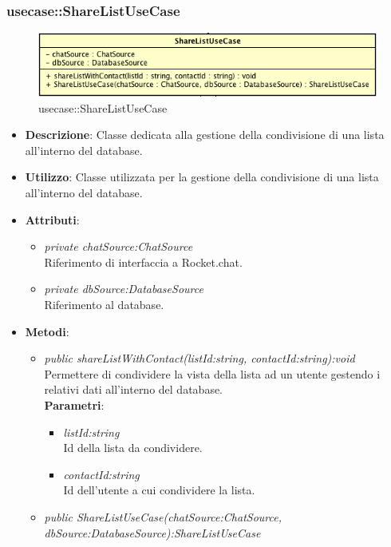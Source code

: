 \subsubsection{usecase::ShareListUseCase}

\label{usecase::ShareListUseCase}
\begin{figure}[H]
	\centering
	\includegraphics[scale=0.5]{Sezioni/SottosezioniST/img/app/ShareListUseCase.png}
	\caption{usecase::ShareListUseCase}
\end{figure}

\begin{itemize}
\item \textbf{Descrizione}: Classe dedicata alla gestione della condivisione di una lista all'interno del database.
\item \textbf{Utilizzo}: Classe utilizzata per la gestione della condivisione di una lista all'interno del database.
\item \textbf{Attributi}: 
\begin{itemize}
\item \textit{private chatSource:ChatSource}\\
	Riferimento di interfaccia a Rocket.chat.
\item \textit{private dbSource:DatabaseSource}\\
	Riferimento al database.
\end{itemize}
\item \textbf{Metodi}:
\begin{itemize}
\item \textit{public shareListWithContact(listId:string, contactId:string):void}\\
	Permettere di condividere la vista della lista ad un utente gestendo i relativi dati all'interno del database.
	\\ \textbf{Parametri}: \begin{itemize}
	\item \textit{listId:string}\\
	Id della lista da condividere.
	\item \textit{contactId:string}\\
	Id dell'utente a cui condividere la lista.
	\end{itemize} 
\item \textit{public ShareListUseCase(chatSource:ChatSource, dbSource:DatabaseSource):ShareListUseCase}\\

\end{itemize}
\end{itemize}
